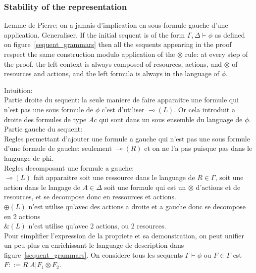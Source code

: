\documentclass[runningheads,a4paper]{llncs}
\begin{document}
\subsubsection{Stability of the representation}
Lemme de Pierre: on a jamais d'implication en sous-formule gauche d'une application. Generaliser.
If the initial sequent is of the form $\Gamma , \Delta \vdash \phi$ as defined on figure~\ref{sequent_grammars} then all the sequents appearing in the proof respect the same construction modulo application of the $\otimes$ rule: at every step of the proof, the left context is always composed of resources, actions, and $\otimes$ of resources and actions, and the left formula is always in the language of $\phi$.

Intuition:\\
Partie droite du sequent: la seule maniere de faire apparaitre une formule qui n'est pas une sous formule de $\phi$ c'est d'utiliser $\multimap(L)$. Or cela introduit a droite des formules de type $Ac$ qui sont dans un sous ensemble du language de $\phi$.\\
Partie gauche du sequent:\\
Regles permettant d'ajouter une formule a gauche qui n'est pas une sous formule d'une formule de gauche: seulement  $\multimap(R)$ et on ne l'a pas puisque pas dans le language de phi.\\
Regles decomposant une formule a gauche:\\
$\multimap(L)$ fait apparaitre soit une ressource dans le language de $R \in \Gamma$, soit une action dans le langage de $A\in\Delta$ soit une formule qui est un $\otimes$ d'actions et de resources, et se decompose donc en ressources et actions.\\
$\oplus(L)$ n'est utilise qu'avec des actions a droite et a gauche donc se decompose en 2 actions\\
$\&(L)$ n'est utilise qu'avec 2 actions, ou 2 resources.\\

Pour simplifier l'expression de la propriete et sa demonstration, on peut unifier un peu plus en enrichissant le language de description dans figure~\ref{sequent_grammars}. On considere tous les sequents $\Gamma \vdash \phi$ ou $F\in\Gamma$ est $F::= R|A| F_{1}\otimes F_{2}$.
\end{document}
